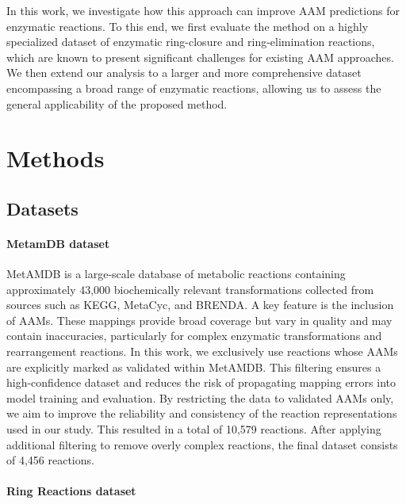 \documentclass[a4paper,12pt]{article} %
\begin{document}
In this work, we investigate how this approach can improve AAM predictions for enzymatic reactions. To this end, we first evaluate the method on a highly specialized dataset of enzymatic ring-closure and ring-elimination reactions, which are known to present significant challenges for existing AAM approaches. We then extend our analysis to a larger and more comprehensive dataset encompassing a broad range of enzymatic reactions, allowing us to assess the general applicability of the proposed method.	
	
\section{Methods}	

\subsection{Datasets}

\paragraph{MetamDB dataset}

MetAMDB is a large-scale database of metabolic reactions containing approximately 43,000 biochemically relevant transformations collected from sources such as KEGG, MetaCyc, and BRENDA. A key feature is the inclusion of AAMs. These mappings provide broad coverage but vary in quality and may contain inaccuracies, particularly for complex enzymatic transformations and rearrangement reactions. In this work, we exclusively use reactions whose AAMs are explicitly marked as validated within MetAMDB. This filtering ensures a high-confidence dataset and reduces the risk of propagating mapping errors into model training and evaluation. By restricting the data to validated AAMs only, we aim to improve the reliability and consistency of the reaction representations used in our study. This resulted in a total of 10,579 reactions. After applying additional filtering to remove overly complex reactions, the final dataset consists of 4,456 reactions.

\paragraph{Ring Reactions dataset}
\end{document}

